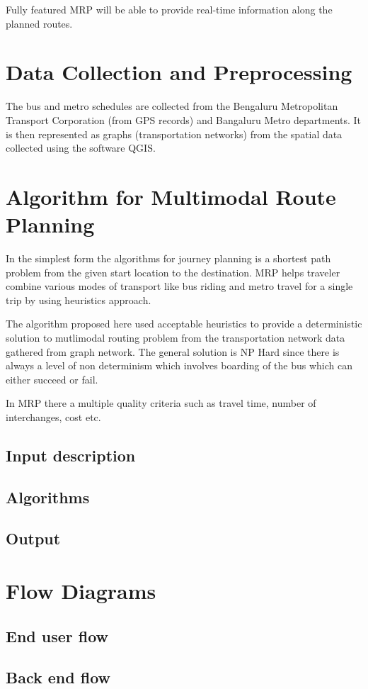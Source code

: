\documentclass[12pt,a4paper]{article}
\begin{document}
Fully featured MRP will be able to provide real-time information along the planned routes.

\section{Data Collection and Preprocessing}

The bus and metro schedules are collected from the Bengaluru Metropolitan Transport Corporation (from GPS records) and Bangaluru Metro departments. It is then represented as graphs (transportation networks) from the spatial data collected using the software QGIS. 


\section{Algorithm for Multimodal Route Planning}

In the simplest form the algorithms for journey planning is a shortest path problem from the given start location to the destination. MRP helps traveler combine various modes of transport like bus riding and metro travel for a single trip by using heuristics approach. 

The algorithm proposed here used acceptable heuristics to provide a deterministic solution to mutlimodal routing problem from the transportation network data gathered from  graph network. The general solution is NP Hard since there is always a level of non determinism which involves boarding of the bus which can either succeed or fail.

In MRP there a multiple quality criteria such as travel time, number of interchanges, cost etc.

\subsection{Input description}

\subsection{Algorithms}

\subsection{Output}

\section{Flow Diagrams}

\subsection{End user flow}

\subsection{Back end flow}
\end{document}

